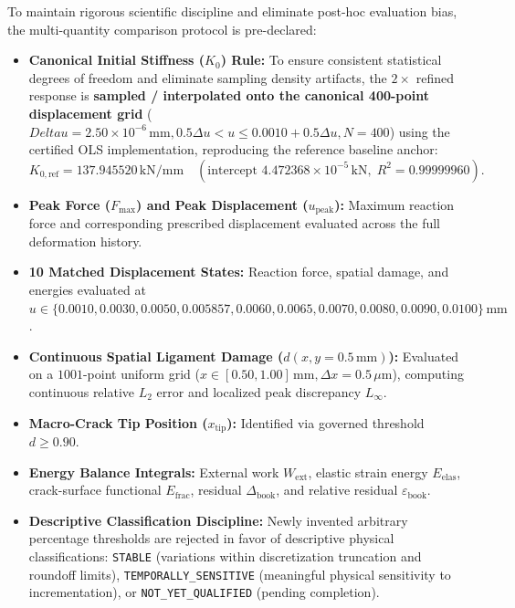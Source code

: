 To maintain rigorous scientific discipline and eliminate post-hoc evaluation bias, the multi-quantity comparison protocol is pre-declared:
\begin{itemize}
    \item \textbf{Canonical Initial Stiffness ($K_0$) Rule:} To ensure consistent statistical degrees of freedom and eliminate sampling density artifacts, the $2\times$ refined response is \textbf{sampled / interpolated onto the canonical 400-point displacement grid} ($Delta u = 2.50\times 10^{-6}\,\mathrm{mm}, 0.5\Delta u < u \le 0.0010 + 0.5\Delta u, N = 400$) using the certified OLS implementation, reproducing the reference baseline anchor:
    \begin{equation}
    K_{0,\mathrm{ref}} = 137.945520\,\mathrm{kN/mm} \quad (\text{intercept } 4.472368\times 10^{-5}\,\mathrm{kN}, \; R^2 = 0.99999960).
    \end{equation}
    \item \textbf{Peak Force ($F_{\max}$) and Peak Displacement ($u_{\mathrm{peak}}$):} Maximum reaction force and corresponding prescribed displacement evaluated across the full deformation history.
    \item \textbf{10 Matched Displacement States:} Reaction force, spatial damage, and energies evaluated at $u \in \{0.0010, 0.0030, 0.0050, 0.005857, 0.0060, 0.0065, 0.0070, 0.0080, 0.0090, 0.0100\}\,\mathrm{mm}$.
    \item \textbf{Continuous Spatial Ligament Damage ($d(x, y=0.5\,\mathrm{mm})$):} Evaluated on a $1001$-point uniform grid ($x \in [0.50, 1.00]\,\mathrm{mm}, \Delta x = 0.5\,\mu\mathrm{m}$), computing continuous relative $L_2$ error and localized peak discrepancy $L_\infty$.
    \item \textbf{Macro-Crack Tip Position ($x_{\mathrm{tip}}$):} Identified via governed threshold $d \ge 0.90$.
    \item \textbf{Energy Balance Integrals:} External work $W_{\mathrm{ext}}$, elastic strain energy $E_{\mathrm{elas}}$, crack-surface functional $E_{\mathrm{frac}}$, residual $\Delta_{\mathrm{book}}$, and relative residual $\varepsilon_{\mathrm{book}}$.
    \item \textbf{Descriptive Classification Discipline:} Newly invented arbitrary percentage thresholds are rejected in favor of descriptive physical classifications: \texttt{STABLE} (variations within discretization truncation and roundoff limits), \texttt{TEMPORALLY\_SENSITIVE} (meaningful physical sensitivity to incrementation), or \texttt{NOT\_YET\_QUALIFIED} (pending completion).
\end{itemize}

